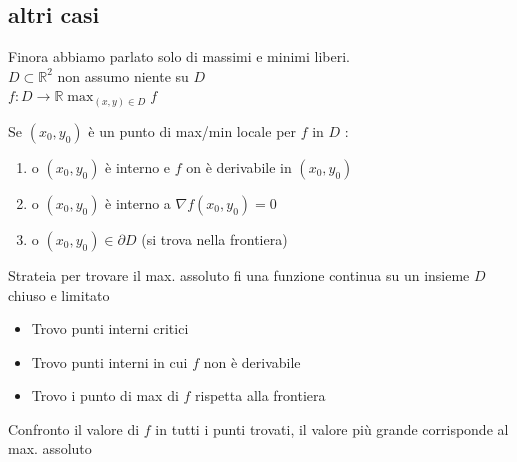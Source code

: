 \documentclass[a4paper, oneside]{article}
\begin{document}
        \subsection{altri casi}
        Finora abbiamo parlato solo di massimi e minimi liberi.\\
        $D \subset \mathbb{R}^2$ non assumo niente su $D$\\
        $f:D \to \mathbb{R} \max_{(x,y) \in D} f$
        \begin{theorem}
            Se $(x_0,y_0)$ è un punto di max/min locale per $f$ in $D$ :
            \begin{enumerate}[$i)$]
                \item o $(x_0,y_0)$ è interno e $f$ on è derivabile in $(x_0,y_0)$
                \item o $(x_0,y_0)$ è interno a $\nabla f (x_0,y_0) = 0$
                \item o $(x_0,y_0) \in \partial D$ (si trova nella frontiera)  
            \end{enumerate}
        \end{theorem}
        \begin{proposition}
            Strateia per trovare il max. assoluto fi una funzione continua su un insieme $D$ chiuso e limitato\\
            \begin{itemize}
                \item Trovo punti interni critici
                \item Trovo punti interni in cui $f$ non è derivabile
                \item Trovo i punto di max di $f$ rispetta alla frontiera
            \end{itemize}
            Confronto il valore di $f$ in tutti i punti trovati, il valore più grande corrisponde al max. assoluto
        \end{proposition}
\end{document}

